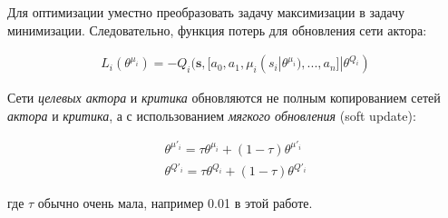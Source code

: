 Для оптимизации уместно преобразовать задачу максимизации в задачу минимизации. Следовательно, функция потерь для обновления сети актора:

\begin{equation}
    \begin{multlined}
        L_i(\theta^{\mu_i}) = -Q_i(\mathbf{s}, [a_0, a_1, \mu_i(s_i|\theta^{\mu_i}), ..., a_n]|\theta^{Q_i})
    \end{multlined}
\end{equation}

Сети \textit{целевых актора} и \textit{критика} обновляются не полным копированием сетей \textit{актора} и \textit{критика}, а с использованием \textit{мягкого обновления} (soft update):

\begin{equation}
    \begin{multlined}
        \theta^{\mu'_i} = \tau \theta^{\mu_i} + (1 - \tau)\theta^{\mu'_i}\\
        \theta^{Q'_i} = \tau \theta^{Q_i} + (1 - \tau)\theta^{Q'_i}
    \end{multlined}
\end{equation}

где $\tau$ обычно очень мала, например 0.01 в этой работе.
